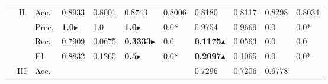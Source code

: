 \begin{tabular}{cclllllllll}
    \cmidrule{2-11}
                                                                                           & \multirow{4}{*}{II}               & Acc.                                                 & 0.8933                  & 0.8001                  & 0.8743                       & 0.8006                  & 0.8180                                                                       & 0.8117                                                                      & 0.8298                                    & 0.8034                                    \\
                                                                                           &                                   & Prec.                                                & \textbf{1.0}$\blacktriangleright$            & 1.0                     & \textbf{1.0}$\blacktriangleright$                 & 0.0*                    & 0.9754                                                                       & 0.9669                                                                      & 0.0                                       & 0.0*                                      \\
                                                                                           &                                   & Rec.                                                 & 0.7909                  & 0.0675                  & \textbf{0.3333}$\blacktriangleright$              & 0.0                     & \textbf{0.1175}$\blacktriangle$                                                             & 0.0563                                                                      & 0.0                                       & 0.0                                       \\
                                                                                           &                                   & F1                                                   & 0.8832                  & 0.1265                  & \textbf{0.5}$\blacktriangleright$                 & 0.0*                    & \textbf{0.2097}$\blacktriangle$                                                             & 0.1065                                                                      & 0.0                                       & 0.0*                                      \\ 
    \cmidrule{2-11}
                                                                                           & \multirow{4}{*}{III}              & Acc.                                                 &                         &                         &                              &                         & 0.7296                                                                       & 0.7206                                                                      & 0.6778                                    &                                           \\

\end{tabular}
